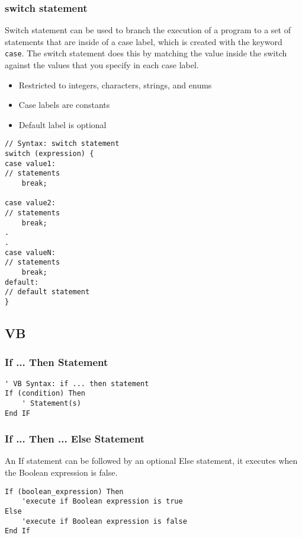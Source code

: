 \subsubsection*{switch statement}
Switch statement can be used to branch the execution of a program to a set of statements that are inside of a case label, which is created with the keyword \verb|case|. The {\cs} switch statement does this by matching the value inside the switch against the values that you specify in each case label.

\begin{itemize}
	\item Restricted to integers, characters, strings, and enums
	\item Case labels are constants
	\item Default label is optional
\end{itemize}

\begin{lstlisting}[numbers=none]
// Syntax: switch statement
switch (expression) {
case value1:
// statements
	break;

case value2:
// statements
	break;
.
.
case valueN:
// statements
	break;
default:
// default statement
}
\end{lstlisting}

\subsection{VB}

\subsubsection*{If ... Then Statement}
\begin{lstlisting}[style=vb, numbers=none]
' VB Syntax: if ... then statement
If (condition) Then
	' Statement(s)
End IF
\end{lstlisting}

\subsubsection{If ... Then ... Else Statement}
An If statement can be followed by an optional Else statement, it executes when the Boolean expression is false.
\begin{lstlisting}[style=vb, numbers = none]
If (boolean_expression) Then
	'execute if Boolean expression is true
Else
	'execute if Boolean expression is false
End If
\end{lstlisting}

